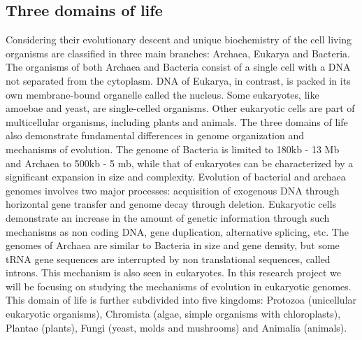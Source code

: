 \documentclass[11pt, a4paper,oneside]{report}
\begin{document}
\subsection{Three domains of life}
Considering their evolutionary descent and unique biochemistry of the cell living organisms are classified in three main branches: Archaea, Eukarya and Bacteria. The organisms of both Archaea and Bacteria consist of a single cell with a DNA not separated from the cytoplasm. DNA of Eukarya, in contrast, is packed in its own membrane-bound organelle called the nucleus. Some eukaryotes, like amoebae and yeast, are single-celled organisms. Other eukaryotic cells are part of multicellular organisms, including plants and animals. The three domains of life also demonstrate fundamental differences in genome organization and mechanisms of evolution. The genome of Bacteria is limited to 180kb - 13 Mb and Archaea to 500kb - 5 mb\cite{Koonin2008}, while that of eukaryotes can be characterized by a significant expansion in size\cite{Gregory2007} and complexity\cite{Parfrey2008}. Evolution of bacterial and archaea genomes involves two major processes: acquisition of exogenous DNA through horizontal gene transfer and genome decay through deletion\cite{Pal2005}. Eukaryotic cells demonstrate an increase in the amount of genetic information through such mechanisms as non coding DNA, gene duplication, alternative splicing, etc.  The genomes of Archaea are similar to Bacteria in size and gene density, but some tRNA gene sequences are interrupted by non translational sequences, called introns. This mechanism is also seen in eukaryotes. 
In this research project we will be focusing on studying the mechanisms of evolution in eukaryotic genomes. This domain of life is further subdivided into five kingdoms: Protozoa (unicellular eukaryotic organisms), Chromista (algae, simple organisms with chloroplasts), Plantae (plants), Fungi (yeast, molds and mushrooms) and Animalia (animals).    
\end{document}
